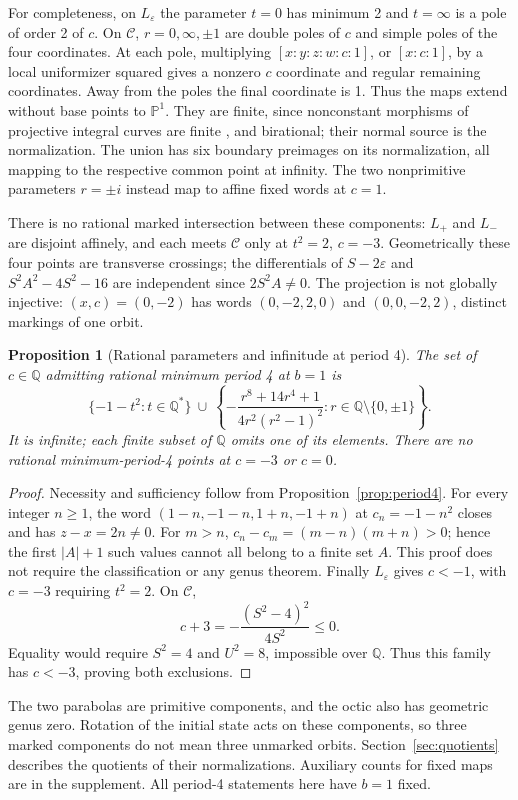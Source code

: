 \documentclass{jT}
\newcommand{\Q}{\mathbb Q}
\newcommand{\PP}{\mathbb P}
\newtheorem{proposition}{Proposition}[section]
\begin{document}
For completeness, on $L_\varepsilon$ the parameter $t=0$ has minimum 2 and $t=\infty$ is a pole of order 2 of $c$. On $\mathcal C$, $r=0,\infty,\pm1$ are double poles of $c$ and simple poles of the four coordinates. At each pole, multiplying $[x:y:z:w:c:1]$, or $[x:c:1]$, by a local uniformizer squared gives a nonzero $c$ coordinate and regular remaining coordinates. Away from the poles the final coordinate is 1. Thus the maps extend without base points to $\PP^1$. They are finite, since nonconstant morphisms of projective integral curves are finite \cite[Lemma 2.4, tag 0CCL]{stacks}, and birational; their normal source is the normalization. The union has six boundary preimages on its normalization, all mapping to the respective common point at infinity. The two nonprimitive parameters $r=\pm i$ instead map to affine fixed words at $c=1$.

There is no rational marked intersection between these components: $L_+$ and $L_-$ are disjoint affinely, and each meets $\mathcal C$ only at $t^2=2$, $c=-3$. Geometrically these four points are transverse crossings; the differentials of $S-2\varepsilon$ and $S^2A^2-4S^2-16$ are independent since $2S^2A\ne0$. The projection is not globally injective: $(x,c)=(0,-2)$ has words $(0,-2,2,0)$ and $(0,0,-2,2)$, distinct markings of one orbit.

\begin{proposition}[Rational parameters and infinitude at period 4]\label{prop:p4-infinite}
The set of $c\in\Q$ admitting rational minimum period 4 at $b=1$ is
\[
\{-1-t^2:t\in\Q^*\}\ \cup\
\left\{-\frac{r^8+14r^4+1}{4r^2(r^2-1)^2}:r\in\Q\setminus\{0,\pm1\}\right\}.
\]
It is infinite; each finite subset of $\Q$ omits one of its elements. There are no rational minimum-period-4 points at $c=-3$ or $c=0$.
\end{proposition}
\begin{proof}
Necessity and sufficiency follow from Proposition~\ref{prop:period4}. For every integer $n\ge1$, the word $(1-n,-1-n,1+n,-1+n)$ at $c_n=-1-n^2$ closes and has $z-x=2n\ne0$. For $m>n$, $c_n-c_m=(m-n)(m+n)>0$; hence the first $|A|+1$ such values cannot all belong to a finite set $A$. This proof does not require the classification or any genus theorem. Finally $L_\varepsilon$ gives $c<-1$, with $c=-3$ requiring $t^2=2$. On $\mathcal C$,
\[
c+3=-\frac{(S^2-4)^2}{4S^2}\le0.
\]
Equality would require $S^2=4$ and $U^2=8$, impossible over $\Q$. Thus this family has $c<-3$, proving both exclusions.
\end{proof}
The two parabolas are primitive components, and the octic also has geometric genus zero. Rotation of the initial state acts on these components, so three marked components do not mean three unmarked orbits. Section~\ref{sec:quotients} describes the quotients of their normalizations. Auxiliary counts for fixed maps are in the supplement. All period-4 statements here have $b=1$ fixed.
\end{document}
